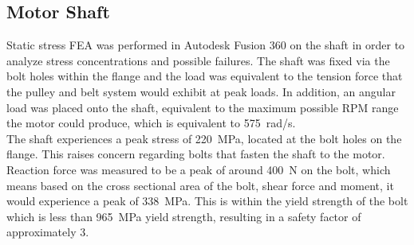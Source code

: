 \documentclass[main.tex]{subfiles}
\begin{document}
    \subsection{Motor Shaft}

    Static stress FEA was performed in Autodesk Fusion 360 on the shaft in order to analyze stress concentrations and possible failures. The shaft was fixed via the bolt holes within the flange and the load was equivalent to the tension force that the pulley and belt system would exhibit at peak loads. In addition, an angular load was placed onto the shaft, equivalent to the maximum possible RPM range the motor could produce, which is equivalent to \SI{575}{rad/s}.\\

    The shaft experiences a peak stress of \SI{220}{MPa}, located at the bolt holes on the flange. This raises concern regarding bolts that fasten the shaft to the motor. Reaction force was measured to be a peak of around \SI{400}{N} on the bolt, which means based on the cross sectional area of the bolt, shear force and moment, it would experience a peak of \SI{338}{MPa}. This is within the yield strength of the bolt which is less than \SI{965}{MPa} yield strength, resulting in a safety factor of approximately 3.\\
\end{document}
